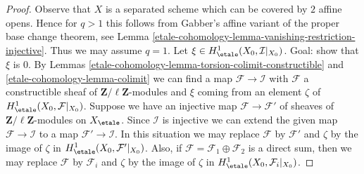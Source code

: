\begin{proof}
Observe that $X$ is a separated scheme which can be covered by $2$
affine opens. Hence for $q > 1$ this follows from Gabber's affine
variant of the proper base change theorem, see
Lemma \ref{etale-cohomology-lemma-vanishing-restriction-injective}.
Thus we may assume $q = 1$. Let
$\xi \in H^1_\etale(X_0, \mathcal{I}|_{X_0})$.
Goal: show that $\xi$ is $0$.
By Lemmas \ref{etale-cohomology-lemma-torsion-colimit-constructible} and
\ref{etale-cohomology-lemma-colimit} we can find a map $\mathcal{F} \to \mathcal{I}$
with $\mathcal{F}$ a constructible sheaf of
$\mathbf{Z}/\ell\mathbf{Z}$-modules
and $\xi$ coming from an element $\zeta$ of
$H^1_\etale(X_0, \mathcal{F}|_{X_0})$. Suppose we have an injective map
$\mathcal{F} \to \mathcal{F}'$ of sheaves of
$\mathbf{Z}/\ell\mathbf{Z}$-modules on $X_\etale$.
Since $\mathcal{I}$ is injective we can extend the given map
$\mathcal{F} \to \mathcal{I}$ to a map $\mathcal{F}' \to \mathcal{I}$.
In this situation we may replace $\mathcal{F}$ by $\mathcal{F}'$
and $\zeta$ by the image of $\zeta$ in $H^1_\etale(X_0, \mathcal{F}'|_{X_0})$.
Also, if $\mathcal{F} = \mathcal{F}_1 \oplus \mathcal{F}_2$ is a direct sum,
then we may replace $\mathcal{F}$ by $\mathcal{F}_i$
and $\zeta$ by the image of $\zeta$ in $H^1_\etale(X_0, \mathcal{F}_i|_{X_0})$.


\end{proof}
